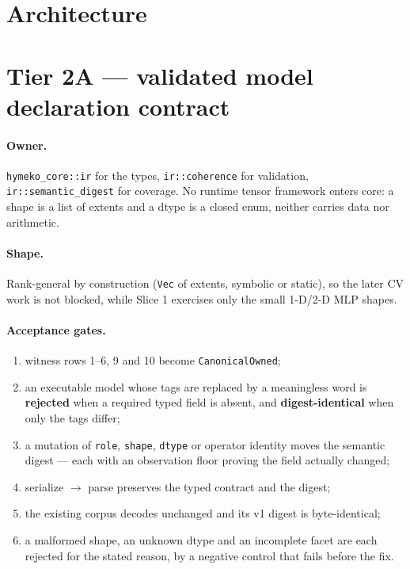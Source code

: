 \documentclass[11pt,a4paper]{article}
\begin{document}
\section{Architecture}

\begin{center}\end{center}

\section{Tier 2A --- validated model declaration contract}

\paragraph{Owner.} \texttt{hymeko\_core::ir} for the types, \texttt{ir::coherence} for validation,
\texttt{ir::semantic\_digest} for coverage. No runtime tensor framework enters core: a shape is a
list of extents and a dtype is a closed enum, neither carries data nor arithmetic.

\paragraph{Shape.} Rank-general by construction (\texttt{Vec} of extents, symbolic or static), so
the later CV work is not blocked, while Slice 1 exercises only the small 1-D/2-D MLP shapes.

\paragraph{Acceptance gates.}
\begin{enumerate}\small
\item witness rows 1--6, 9 and 10 become \texttt{CanonicalOwned};
\item an executable model whose tags are replaced by a meaningless word is \textbf{rejected} when a
required typed field is absent, and \textbf{digest-identical} when only the tags differ;
\item a mutation of \texttt{role}, \texttt{shape}, \texttt{dtype} or operator identity moves the
semantic digest --- each with an observation floor proving the field actually changed;
\item serialize $\rightarrow$ parse preserves the typed contract and the digest;
\item the existing corpus decodes unchanged and its v1 digest is byte-identical;
\item a malformed shape, an unknown dtype and an incomplete facet are each rejected for the stated
reason, by a negative control that fails before the fix.
\end{enumerate}
\end{document}
